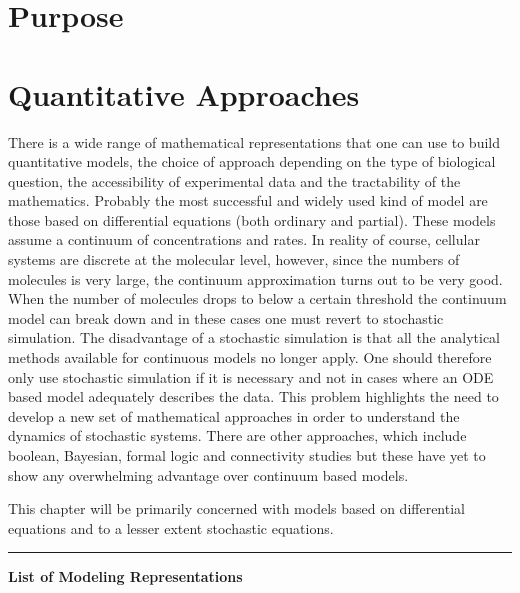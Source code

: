 \section{Purpose}

\section{Quantitative Approaches}

There is a wide range of mathematical representations that one can use
to build quantitative models, the choice of approach depending on the
type of biological question, the accessibility of experimental data and
the tractability of the mathematics. Probably the most successful and
widely used kind of model are those based on differential equations
(both ordinary and partial). These models assume a continuum of
concentrations and rates. In reality of course, cellular systems are
discrete at the molecular level, however, since the numbers of molecules
is very large, the continuum approximation turns out to be very good.
When the number of molecules drops to below a certain threshold the
continuum model can break down and in these cases one must revert to
stochastic simulation. The disadvantage of a stochastic simulation is
that all the analytical methods available for continuous models no
longer apply. One should therefore only use stochastic simulation if it
is necessary and not in cases where an ODE based model adequately
describes the data. This problem highlights the need to develop a new
set of mathematical approaches in order to understand the dynamics of
stochastic systems. There are other approaches, which include boolean,
Bayesian, formal logic and connectivity studies but these have yet to
show any overwhelming advantage over continuum based models.

This chapter will be primarily concerned with models based on
differential equations and to a lesser extent stochastic equations.

\begin{center}\rule{3in}{0.4pt}\end{center}

\textbf{List of Modeling Representations}

